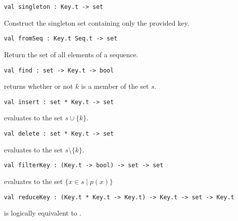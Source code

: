 \begin{gram}[singleton]
\label{gr:set-interface:singleton}
\begin{verbatim}
val singleton : Key.t -> set
\end{verbatim}
Construct the singleton set containing only the provided key.
\end{gram}

\begin{gram}[fromSeq]
\begin{verbatim}
val fromSeq : Key.t Seq.t -> set
\end{verbatim}
Return the set of all elements of a sequence.
\end{gram}

\begin{gram}[find]
\begin{verbatim}
val find : set -> Key.t -> bool
\end{verbatim}
 returns whether or not $k$ is a member of the set $s$.
\end{gram}

\begin{gram}[insert]
\begin{verbatim}
val insert : set * Key.t -> set
\end{verbatim}
 evaluates to the set $s \cup \{k\}$.
\end{gram}

\begin{gram}[delete]
\begin{verbatim}
val delete : set * Key.t -> set
\end{verbatim}
 evaluates to the set $s \setminus \{k\}$.
\end{gram}

\begin{gram}[filterKey]
\begin{verbatim}
val filterKey : (Key.t -> bool) -> set -> set
\end{verbatim}
 evaluates to the set $\{x \in s \mathbin| p(x) \}$
\end{gram}

\begin{gram}[reduceKey]
\begin{verbatim}
val reduceKey : (Key.t * Key.t -> Key.t) -> Key.t -> set -> Key.t
\end{verbatim}
 is logically equivalent to .
\end{gram}

